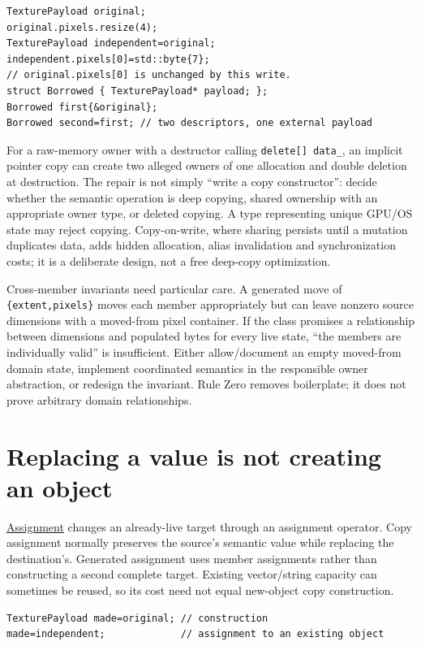\begin{verbatim}
TexturePayload original;
original.pixels.resize(4);
TexturePayload independent=original;
independent.pixels[0]=std::byte{7};
// original.pixels[0] is unchanged by this write.
struct Borrowed { TexturePayload* payload; };
Borrowed first{&original};
Borrowed second=first; // two descriptors, one external payload
\end{verbatim}

For a raw-memory owner with a destructor calling \texttt{delete{[}{]}\ data\_}, an implicit pointer copy can create two alleged owners of one allocation and double deletion at destruction. The repair is not simply ``write a copy constructor'': decide whether the semantic operation is deep copying, shared ownership with an appropriate owner type, or deleted copying. A type representing unique GPU/OS state may reject copying. Copy-on-write, where sharing persists until a mutation duplicates data, adds hidden allocation, alias invalidation and synchronization costs; it is a deliberate design, not a free deep-copy optimization.

Cross-member invariants need particular care. A generated move of \texttt{\{extent,pixels\}} moves each member appropriately but can leave nonzero source dimensions with a moved-from pixel container. If the class promises a relationship between dimensions and populated bytes for every live state, ``the members are individually valid'' is insufficient. Either allow/document an empty moved-from domain state, implement coordinated semantics in the responsible owner abstraction, or redesign the invariant. Rule Zero removes boilerplate; it does not prove arbitrary domain relationships.

\section{Replacing a value is not creating an object}\label{05-engine-i-ch003-replacing-a-value-is-not-creating-an-object}

\hyperref[appendix-bea6beb5350f]{Assignment} changes an already-live target through an assignment operator. Copy assignment normally preserves the source's semantic value while replacing the destination's. Generated assignment uses member assignments rather than constructing a second complete target. Existing vector/string capacity can sometimes be reused, so its cost need not equal new-object copy construction.

\begin{verbatim}
TexturePayload made=original; // construction
made=independent;             // assignment to an existing object
\end{verbatim}


